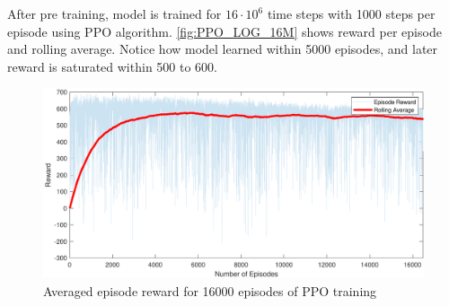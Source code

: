 \noindent After pre training, model is trained for $16 \cdotp 10^6$ time steps with 1000 steps per episode using PPO algorithm. \autoref{fig:PPO_LOG_16M} shows reward per episode and rolling average. Notice how model learned within 5000 episodes, and later reward is saturated within 500 to 600.
\begin{figure}[H]
    \centering
    \includegraphics[width=\textwidth]{figures/plots/RL/PPOlog16M.pdf}
    \caption{Averaged episode reward for 16000 episodes of PPO training}
    \label{fig:PPO_LOG_16M}
\end{figure}
